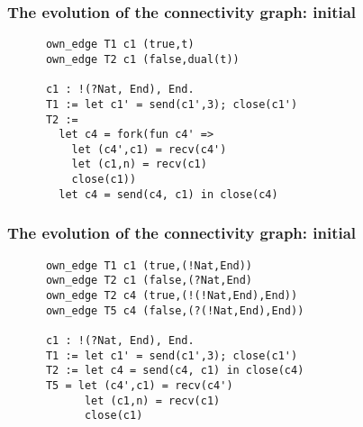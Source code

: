 \documentclass[aspectratio=169]{beamer}
\begin{document}
\begin{frame}[fragile]
  \frametitle{The evolution of the connectivity graph: initial}

    \begin{verbatim}
      own_edge T1 c1 (true,t)
      own_edge T2 c1 (false,dual(t))

      c1 : !(?Nat, End), End.
      T1 := let c1' = send(c1',3); close(c1')
      T2 :=
        let c4 = fork(fun c4' =>
          let (c4',c1) = recv(c4')
          let (c1,n) = recv(c1)
          close(c1))
        let c4 = send(c4, c1) in close(c4)
    \end{verbatim}
\end{frame}

\begin{frame}[fragile]
  \frametitle{The evolution of the connectivity graph: initial}

    \begin{verbatim}
      own_edge T1 c1 (true,(!Nat,End))
      own_edge T2 c1 (false,(?Nat,End)
      own_edge T2 c4 (true,(!(!Nat,End),End))
      own_edge T5 c4 (false,(?(!Nat,End),End))

      c1 : !(?Nat, End), End.
      T1 := let c1' = send(c1',3); close(c1')
      T2 := let c4 = send(c4, c1) in close(c4)
      T5 = let (c4',c1) = recv(c4')
            let (c1,n) = recv(c1)
            close(c1)
    \end{verbatim}
\end{frame}
\end{document}
